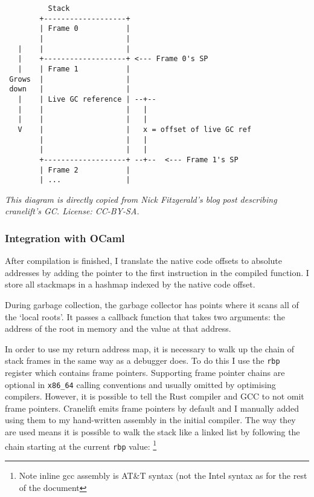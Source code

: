 \begin{verbatim}
          Stack
        +-------------------+
        | Frame 0           |
        |                   |
   |    |                   |
   |    +-------------------+ <--- Frame 0's SP
   |    | Frame 1           |
 Grows  |                   |
 down   |                   |
   |    | Live GC reference | --+--
   |    |                   |   |
   |    |                   |   |
   V    |                   |   x = offset of live GC ref
        |                   |   |
        |                   |   |
        +-------------------+ --+--  <--- Frame 1's SP
        | Frame 2           |
        | ...               |
\end{verbatim}

\noindent\emph{
      This diagram is directly copied from Nick Fitzgerald's blog post \cite{refblog} describing
      cranelift's GC. License: CC-BY-SA.
}

\subsubsection{Integration with OCaml}

After compilation is finished, I translate the native code offsets to absolute addresses by adding
the
pointer to the first instruction in the compiled function. I store all stackmaps in a hashmap
indexed by the native code offset.

During garbage collection, the garbage collector has points where it scans all of the `local
roots'. It passes a callback function that takes two arguments: the address of the root in
memory
and the value at that address.

In order to use my return address map, it is necessary to walk up the chain of stack frames in the
same way as a debugger does. To do this I use the \texttt{rbp} register which contains frame
pointers. Supporting frame pointer chains are optional in \texttt{x86\_64} calling conventions and
usually omitted by optimising compilers. However, it is possible to tell the Rust compiler and GCC
to not omit frame pointers. Cranelift emits frame pointers by default and I manually added using
them to my hand-written assembly in the initial compiler.
The way they are used means it is possible to walk the stack like a linked list by following the
chain starting at the current \texttt{rbp} value:
\footnote{Note inline gcc assembly is AT\&T syntax (not the Intel syntax as for the rest of the
      document}

